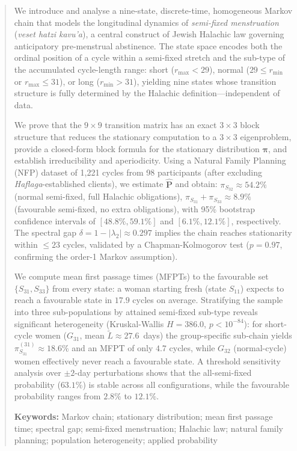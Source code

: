 \documentclass[12pt,a4paper]{article}
\newcommand{\piv}{\boldsymbol{\pi}}
\newcommand{\mat}[1]{\mathbf{#1}}
\newcommand{\haflaga}{\textit{Haflaga}}
\begin{document}
\begin{abstract}
\noindent
We introduce and analyse a nine-state, discrete-time, homogeneous Markov chain
that models the longitudinal dynamics of \emph{semi-fixed menstruation}
(\textit{veset hatzi kavu'a}), a central construct of Jewish Halachic law governing
anticipatory pre-menstrual abstinence. The state space encodes both the ordinal
position of a cycle within a semi-fixed stretch and the sub-type of the accumulated
cycle-length range: short ($r_{\max} < 29$), normal ($29 \le r_{\min}$ or
$r_{\max} \le 31$), or long ($r_{\min} > 31$), yielding nine states whose
transition structure is fully determined by the Halachic definition---independent
of data.

We prove that the $9\times9$ transition matrix has an exact $3\times3$ block
structure that reduces the stationary computation to a $3\times3$ eigenproblem,
provide a closed-form block formula for the stationary distribution $\piv$, and
establish irreducibility and aperiodicity.  Using a Natural Family Planning (NFP)
dataset of 1{,}221 cycles from 98 participants (after excluding
\haflaga-established clients), we estimate $\hat{\mat{P}}$ and obtain:
$\pi_{S_{32}} \approx 54.2\%$ (normal semi-fixed, full Halachic obligations),
$\pi_{S_{31}}+\pi_{S_{33}} \approx 8.9\%$ (favourable semi-fixed, no extra
obligations), with 95\% bootstrap confidence intervals of
$[48.8\%, 59.1\%]$ and $[6.1\%, 12.1\%]$, respectively.  The spectral gap
$\delta = 1 - |\lambda_2| \approx 0.297$ implies the chain reaches stationarity
within $\le 23$ cycles, validated by a Chapman-Kolmogorov test
($p = 0.97$, confirming the order-1 Markov assumption).

We compute mean first passage times (MFPTs) to the favourable set
$\{S_{31},S_{33}\}$ from every state: a woman starting fresh (state $S_{11}$)
expects to reach a favourable state in $17.9$ cycles on average.  Stratifying the
sample into three sub-populations by attained semi-fixed sub-type reveals
significant heterogeneity (Kruskal-Wallis $H = 386.0$, $p < 10^{-84}$): for
short-cycle women ($G_{31}$, mean $\tilde{L}\approx27.6$~days) the group-specific
sub-chain yields $\pi^{(31)}_{S_{31}} \approx 18.6\%$ and an MFPT of only
$4.7$ cycles, while $G_{32}$ (normal-cycle) women effectively never reach a
favourable state.  A threshold sensitivity analysis over $\pm2$-day perturbations
shows that the all-semi-fixed probability ($63.1\%$) is stable across all
configurations, while the favourable probability ranges from $2.8\%$ to $12.1\%$.

\medskip
\noindent\textbf{Keywords:} Markov chain; stationary distribution; mean first
passage time; spectral gap; semi-fixed menstruation; Halachic law; natural
family planning; population heterogeneity; applied probability
\end{abstract}
\end{document}
